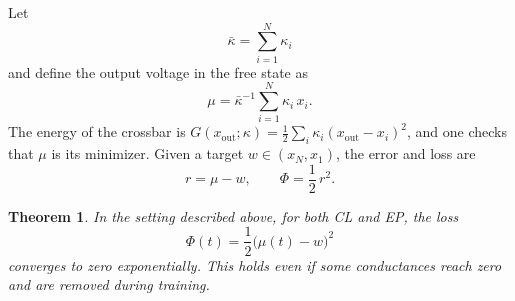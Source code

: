 \documentclass[final, 11pt, nonatbib]{elsarticle}
\theoremstyle{definition}
\theoremstyle{plain}
\newtheorem{theorem}[definition]{Theorem}
\numberwithin{equation}{section}
\begin{document}
Let
\[
\bar{\kappa} = \sum_{i=1}^{N} \kappa_i
\]
and define the output voltage in the free state as
\[
\mu = \bar{\kappa}^{-1} \sum_{i=1}^{N} \kappa_i\, x_i.
\]
The energy of the crossbar is
$G(x_{\mathrm{out}}; \kappa) = \frac{1}{2}\sum_{i} \kappa_i(x_{\mathrm{out}} - x_i)^2$,
and one checks that $\mu$ is its minimizer.
Given a target $w \in (x_N, x_1)$, the error and loss are
\[
r = \mu - w, \qquad \Phi = \dfrac{1}{2}\,r^2.
\]
\begin{theorem}\label{thm:crossbar}                   
  In the setting described above, for both CL and EP, the loss                 
  \[\Phi(t) = \dfrac{1}{2}\big(\mu(t) - w\big)^2 \]
  converges to zero exponentially. This holds even if some conductances reach
  zero and are removed during training.
  \end{theorem}
\end{document}
